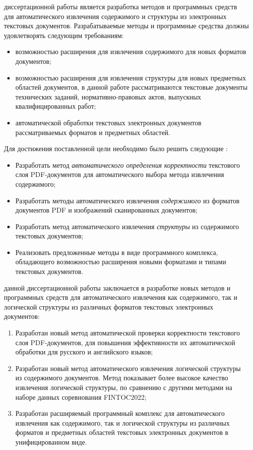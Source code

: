 {\aim} диссертационной работы является разработка методов и программных средств для автоматического извлечения содержимого и структуры из электронных текстовых документов. Разрабатываемые методы и программные средства должны удовлетворять следующим требованиям:
\begin{itemize}
        \item возможностью расширения для извлечения содержимого для новых форматов документов;
        \item возможностью расширения для извлечения структуры для новых предметных областей документов, в данной работе рассматриваются текстовые документы технических заданий, нормативно-правовых актов, выпускных квалифицированных работ;
        \item автоматической обработки текстовых электронных документов рассматриваемых форматов и предметных областей.
\end{itemize}


Для достижения поставленной цели необходимо было решить следующие \underline{\textbf{{\tasksTXT}}}:
\begin{itemize}
        \item Разработать метод \textit{автоматического определения корректности} текстового слоя PDF-документов для автоматического выбора метода извлечения содержимого;
        \item Разработать методы автоматического извлечения \textit{содержимого} из форматов документов PDF и изображений сканированных документов;
        \item Разработать метод автоматического извлечения \textit{структуры} из содержимого текстовых документов;
        \item Реализовать предложенные методы в виде программного комплекса, обладающего возможностью расширения новыми форматами и типами текстовых документов.
\end{itemize}


\underline{\textbf{{\noveltyTXT}}} данной диссертационной работы заключается в разработке новых методов и программных средств для автоматического извлечения как содержимого, так и логической структуры из различных форматов текстовых электронных документов:
\begin{enumerate}
    \item Разработан новый метод автоматической проверки корректности текстового слоя PDF-документов, для повышения эффективности их автоматической обработки для русского и английского языков;
    \item Разработан новый метод автоматического извлечения логической структуры из содержимого документов. Метод показывает более высокое качество извлечения логической структуры, по сравнению с другими методами на наборе данных соревнования FINTOC2022;
    \item Разработан расширяемый программный комплекс для автоматического извлечения как содержимого, так и логической структуры из различных форматов и предметных областей текстовых электронных документов в унифицированном виде.
\end{enumerate}


